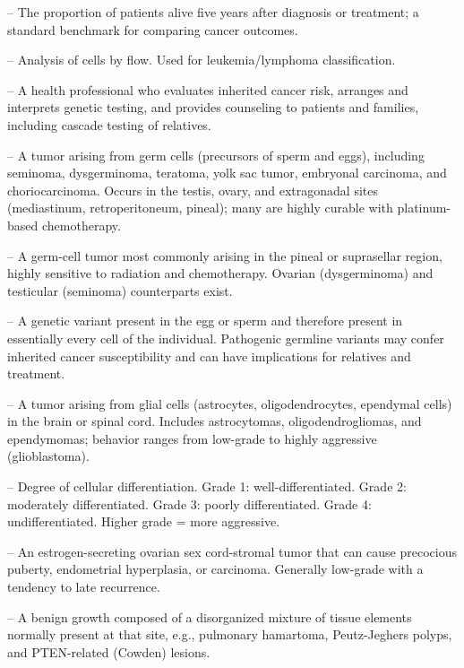 -- The proportion of patients alive five years after diagnosis or treatment; a standard benchmark for comparing cancer outcomes.

-- Analysis of cells by flow. Used for leukemia/lymphoma classification.

-- A health professional who evaluates inherited cancer risk, arranges and interprets genetic testing, and provides counseling to patients and families, including cascade testing of relatives.

-- A tumor arising from germ cells (precursors of sperm and eggs), including seminoma, dysgerminoma, teratoma, yolk sac tumor, embryonal carcinoma, and choriocarcinoma. Occurs in the testis, ovary, and extragonadal sites (mediastinum, retroperitoneum, pineal); many are highly curable with platinum-based chemotherapy.

-- A germ-cell tumor most commonly arising in the pineal or suprasellar region, highly sensitive to radiation and chemotherapy. Ovarian (dysgerminoma) and testicular (seminoma) counterparts exist.

-- A genetic variant present in the egg or sperm and therefore present in essentially every cell of the individual. Pathogenic germline variants may confer inherited cancer susceptibility and can have implications for relatives and treatment.

-- A tumor arising from glial cells (astrocytes, oligodendrocytes, ependymal cells) in the brain or spinal cord. Includes astrocytomas, oligodendrogliomas, and ependymomas; behavior ranges from low-grade to highly aggressive (glioblastoma).

-- Degree of cellular differentiation. Grade 1: well-differentiated. Grade 2: moderately differentiated. Grade 3: poorly differentiated. Grade 4: undifferentiated. Higher grade = more aggressive.

-- An estrogen-secreting ovarian sex cord-stromal tumor that can cause precocious puberty, endometrial hyperplasia, or carcinoma. Generally low-grade with a tendency to late recurrence.

-- A benign growth composed of a disorganized mixture of tissue elements normally present at that site, e.g., pulmonary hamartoma, Peutz-Jeghers polyps, and PTEN-related (Cowden) lesions.

